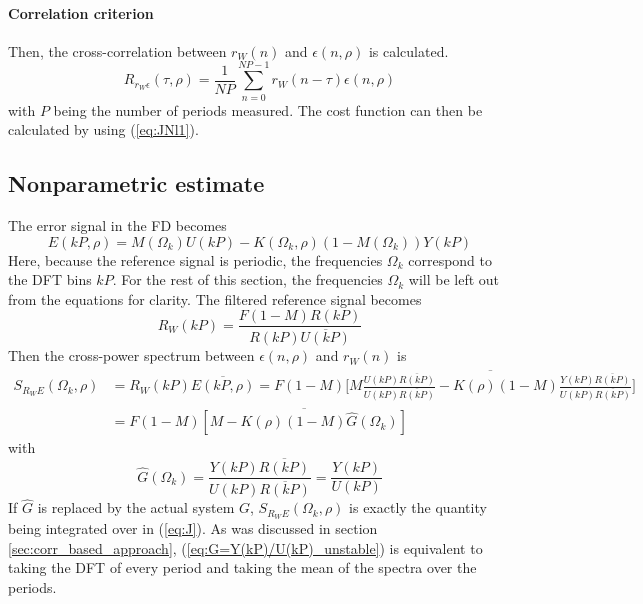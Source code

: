 \paragraph{Correlation criterion}
Then, the cross-correlation between $r_W(n)$ and $\epsilon(n,\rho)$ is calculated.
\begin{equation*}
    R_{r_W \epsilon}(\tau,\rho) = \frac{1}{N\!P} \sum_{n=0}^{N\!P-1} r_W(n-\tau) \epsilon(n,\rho)
\end{equation*}
with $P$ being the number of periods measured. The cost function can then be calculated by using (\ref{eq:JNl1}).

\subsection{Nonparametric estimate}
The error signal in the FD becomes
\begin{equation*}
    E(kP,\rho) = M(\Omega_k) U(kP) - K(\Omega_k,\rho) (1-M(\Omega_k)) Y(kP)
\end{equation*}
Here, because the reference signal is periodic, the frequencies $\Omega_k$ correspond to the DFT bins $kP$. For the rest of this section, the frequencies $\Omega_k$ will be left out from the equations for clarity.
The filtered reference signal becomes
\begin{equation*}
    R_W(kP) = \frac{F (1-M) R(kP)}{R(kP) \overline{U(kP)}}
\end{equation*}
Then the cross-power spectrum between $\epsilon(n,\rho)$ and $r_W(n)$ is
\begin{align*}
    S_{R_W\!E}(\Omega_k,\rho) &= R_W(kP) \overline{E(kP,\rho)} = F(1-M) \overline{\Big[M \frac{U(kP) \overline{R(kP)}}{U(kP) \overline{R(kP)}} - K(\rho) (1-M) \frac{Y(kP) \overline{R(kP)}}{U(kP) \overline{R(kP)}}\Big]}\\
    &= F(1-M) \overline{[M - K(\rho) (1-M) \hat{G}(\Omega_k) ]}
\end{align*}
with 
\begin{equation}
    \hat{G}(\Omega_k) = \frac{Y(kP) \overline{R(kP)}}{U(kP) \overline{R(kP)}} = \frac{Y(kP)}{U(kP)}
    \label{eq:G=Y(kP)/U(kP)_unstable}
\end{equation}
If $\hat G$ is replaced by the actual system $G$, $S_{R_W\!E}(\Omega_k,\rho)$ is exactly the quantity being integrated over in (\ref{eq:J}). As was discussed in section \ref{sec:corr_based_approach}, (\ref{eq:G=Y(kP)/U(kP)_unstable}) is equivalent to taking the DFT of every period and taking the mean of the spectra over the periods.
